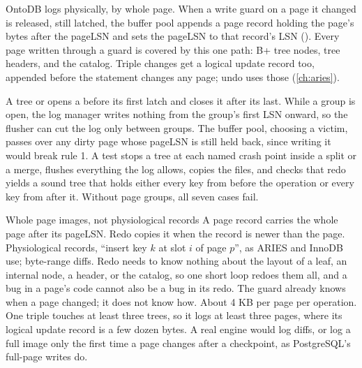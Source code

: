 \begin{ontodb}
OntoDB logs physically, by whole page. When a write guard on a page it changed
is released, still latched, the buffer pool appends a page record holding the
page's bytes after the pageLSN and sets the pageLSN to that record's LSN
(). Every page written through a guard
is covered by this one path: B+ tree nodes, tree headers, and the catalog.
Triple changes get a logical update record too, appended before the
statement changes any page; undo uses those (\cref{ch:aries}).

A tree  or  opens a  before its
first latch and closes it after its last. While a group is open, the log
manager writes nothing from the group's first LSN onward, so the flusher can
cut the log only between groups. The buffer pool, choosing a victim, passes
over any dirty page whose pageLSN is still held back, since writing it would
break rule 1. A test stops a tree at each named crash point inside a split or
a merge, flushes everything the log allows, copies the files, and checks that
redo yields a sound tree that holds either every key from before the
operation or every key from after it. Without page groups, all seven cases
fail.
\end{ontodb}

\begin{decision}{Whole page images, not physiological records}
 A page record carries the whole page after its pageLSN. Redo
copies it when the record is newer than the page.
 Physiological records, ``insert key $k$ at slot $i$ of
page $p$'', as ARIES and InnoDB use; byte-range diffs.
 Redo needs to know nothing about the layout of a leaf, an internal
node, a header, or the catalog, so one short loop redoes them all, and a bug
in a page's code cannot also be a bug in its redo. The guard already knows
when a page changed; it does not know how.
 About 4 KB per page per operation. One triple touches at least
three trees, so it logs at least three pages, where its logical update
record is a few dozen bytes. A real engine would log diffs, or log a full
image only the first time a page changes after a checkpoint, as PostgreSQL's
full-page writes do.
\end{decision}

